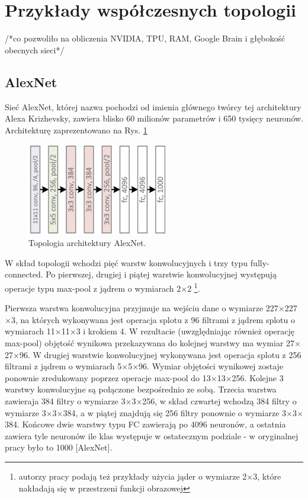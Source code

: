 \section{Przykłady współczesnych topologii}

/*co pozwoliło na obliczenia NVIDIA, TPU, RAM, Google Brain i głębokość obecnych sieci*/

\subsection{AlexNet}
\label{AlexNet}
Sieć AlexNet, której nazwa pochodzi od imienia głównego twórcy tej architektury Alexa Krizhevsky, zawiera blisko 60 milionów parametrów i 650 tysięcy neuronów. Architekturę zaprezentowano na Rys. \ref{AlexNetTopology}
\begin{figure}[h!]
	\centering
	\includegraphics[width=0.55\textwidth]{figures/AlexNet.png}
	\caption{Topologia architektury AlexNet.}
	\label{AlexNetTopology}
\end{figure}

W skład topologii wchodzi pięć warstw konwolucyjnych i trzy typu fully-connected. Po pierwszej, drugiej i piątej warstwie konwolucyjnej występują operacje typu max-pool z jądrem o wymiarach 2$\times$2 \footnote{autorzy pracy podają też przykłady użycia jąder o wymiarze 2$\times$3, które nakładają się w przestrzeni funkcji obrazowej}. 

Pierwsza warstwa konwolucyjna przyjmuje na wejściu dane o wymiarze 227$\times$227$\times$3, na których wykonywana jest operacja splotu z 96 filtrami z jądrem splotu o wymiarach 11$\times$11$\times$3 i krokiem 4. W rezultacie (uwzględniając również operację max-pool) objętość wynikowa przekazywana do kolejnej warstwy ma wymiar 27$\times$27$\times$96. W drugiej warstwie konwolucyjnej wykonywana jest operacja splotu z 256 filtrami z jądrem o wymiarach 5$\times$5$\times$96. Wymiar objętości wynikowej zostaje ponownie zredukowany poprzez operacje max-pool do 13$\times$13$\times$256. Kolejne 3 warstwy konwolucyjne są połączone bezpośrednio ze sobą. Trzecia warstwa zawieraja 384 filtry o wymiarze 3$\times$3$\times$256, w skład czwartej wchodzą 384 filtry o wymiarze 3$\times$3$\times$384, a w piątej znajdują się 256 filtry ponownie o wymiarze 3$\times$3$\times$384. Końcowe dwie warstwy typu FC zawierają po 4096 neuronów, a ostatnia zawiera tyle neuronów ile klas występuje w ostatecznym podziale - w oryginalnej pracy było to 1000 [AlexNet].

